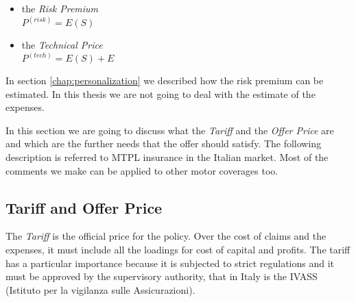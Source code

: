 \documentclass[a4paper, nobind]{templates/ociamthesis}
\providecommand{\tightlist}{%
  \setlength{\itemsep}{0pt}\setlength{\parskip}{0pt}}
\theoremstyle{definition}
\theoremstyle{definition}
\theoremstyle{definition}
\theoremstyle{remark}
\begin{document}
\begin{itemize}
\tightlist
\item
  the \emph{Risk Premium}\\
  \(P^{(risk)} = E(S)\)
\item
  the \emph{Technical Price}\\
  \(P^{(tech)} = E(S) + E\)
\end{itemize}

In section \ref{chap:personalization} we described how the risk premium can be estimated. In this thesis we are not going to deal with the estimate of the expenses.

In this section we are going to discuss what the \emph{Tariff} and the \emph{Offer Price} are and which are the further needs that the offer should satisfy. The following description is referred to MTPL insurance in the Italian market. Most of the comments we make can be applied to other motor coverages too.

\hypertarget{tariff-and-offer-price}{%
\subsection{Tariff and Offer Price}\label{tariff-and-offer-price}}

The \emph{Tariff} is the official price for the policy. Over the cost of claims and the expenses, it must include all the loadings for cost of capital and profits. The tariff has a particular importance because it is subjected to strict regulations and it must be approved by the supervisory authority, that in Italy is the IVASS (Istituto per la vigilanza sulle Assicurazioni).
\end{document}
